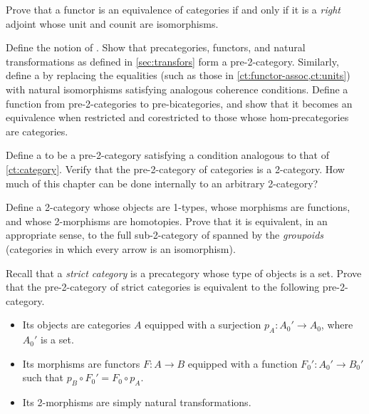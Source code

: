 \begin{ex}\label{ex:functor-equiv-right-adjoint}
  Prove that a functor is an equivalence of categories if and only if it is a \emph{right} adjoint whose unit and counit are isomorphisms.
\end{ex}

\begin{ex}\label{ct:pre2cat}
  Define the notion of .
  Show that precategories, functors, and natural transformations as defined in \cref{sec:transfors} form a pre-2-category.
  Similarly, define a 
  by replacing the equalities (such as those in \cref{ct:functor-assoc,ct:units}) with natural isomorphisms satisfying analogous coherence conditions.
  Define a function from pre-2-categories to pre-bicategories, and show that it becomes an equivalence when restricted and corestricted to those whose hom-pre\-cat\-egories are categories.
\end{ex}

\begin{ex}\label{ct:2cat}
  Define a 
  to be a pre-2-category satisfying a condition analogous to that of \cref{ct:category}.
  Verify that the pre-2-category of categories \ucat is a 2-category.
  How much of this chapter can be done internally to an arbitrary 2-category?
\end{ex}

\begin{ex}\label{ct:groupoids}
  Define a 2-category whose objects are 1-types, whose morphisms are functions, and whose 2-morphisms are homotopies.
  Prove that it is equivalent, in an appropriate sense, to the full sub-2-category of \ucat spanned by the \emph{groupoids} (categories in which every arrow is an isomorphism).
\end{ex}

\begin{ex}\label{ex:2strict-cat}
  Recall that a \emph{strict category} is a precategory whose type of objects is a set.
  Prove that the pre-2-category of strict categories is equivalent to the following pre-2-category.
  \begin{itemize}
  \item Its objects are categories $A$ equipped with a surjection
    $p_A:A_0'\to A_0$, where $A_0'$ is a set.
  \item Its morphisms are functors $F:A\to B$ equipped with a function $F_0':A_0' \to B_0'$ such that $p_B \circ F_0' = F_0 \circ p_A$.
  \item Its 2-morphisms are simply natural transformations.
  \end{itemize}
\end{ex}

